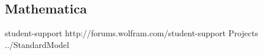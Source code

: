 \subsection { Mathematica }
\htmladdnormallink
{student-support
}{http://forums.wolfram.com/student-support
}
\linebreak
\htmladdnormallink
{Projects
}{../StandardModel
}
\linebreak
